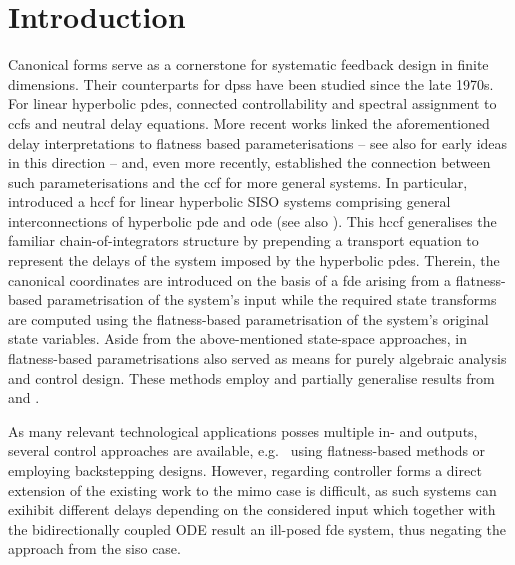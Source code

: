 \section{Introduction}
Canonical forms serve as a cornerstone for systematic feedback
design in finite dimensions. Their counterparts for \glspl{dps}
have been studied since the late 1970s. 
For linear hyperbolic \glspl{pde}, \cite{Russel1978}
connected controllability and spectral assignment to
\glspl{ccf} and neutral delay equations.  
More recent works linked the aforementioned delay interpretations to flatness
based parameterisations \cite{FMRR95cdc,FliMou99} -- see also \cite{CookeKrumme1968jmaa} for early ideas in this direction -- and, even more recently, established the connection between such parameterisations and the \gls{ccf} for more general systems.
In particular, \cite{Woittennek2012-ifacwc} introduced a 
\gls{hccf} for linear hyperbolic SISO systems comprising general interconnections of hyperbolic \gls{pde} and \gls{ode} (see also \cite{Woittennek2011ifac}). This \gls{hccf}
generalises the familiar chain-of-integrators
structure by prepending a transport equation to represent the delays
of the system imposed by the hyperbolic \glspl{pde}.
Therein, the canonical coordinates are introduced on the basis of a \gls{fde} 
arising from a flatness-based parametrisation of the system's input while the required state transforms are computed using the flatness-based parametrisation of the system's original state variables.
Aside from the above-mentioned state-space approaches, in  \cite{Woittennek2010-siam,Gehring2013}  flatness-based parametrisations also served as means for purely algebraic analysis and control design. These methods employ and partially generalise results from
\cite{Brethe1996} and \cite{GluesingLuerssen1997}.

As many relevant technological applications posses multiple in- and outputs,
several control approaches are available, e.g.~ \cite{Knueppel2014} using
flatness-based methods or \cite{Gabriel2024} employing backstepping designs.
However, regarding controller forms a direct extension of the existing work to
the \acs{mimo} case is difficult, as such systems can exihibit
different delays depending on the considered input which together with the
bidirectionally coupled ODE result an ill-posed \gls{fde} system,
thus negating the approach from the \acs{siso} case.

